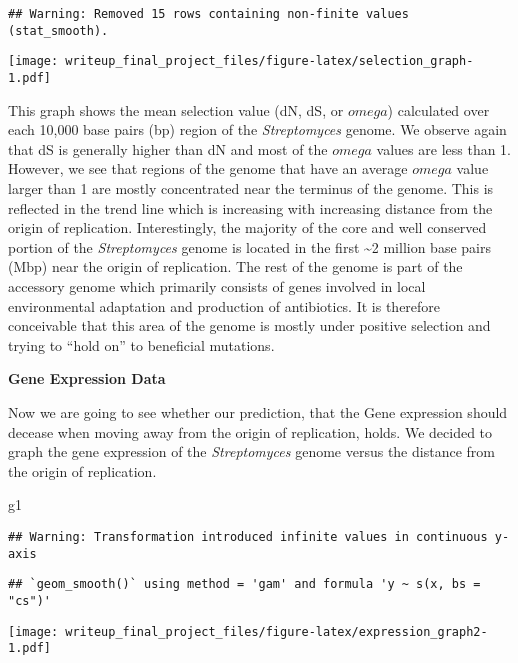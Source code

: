 \documentclass[12pt,]{article}
\newenvironment{Shaded}{\begin{snugshade}}{\end{snugshade}}
\newcommand{\NormalTok}[1]{#1}
\begin{document}
\begin{verbatim}
## Warning: Removed 15 rows containing non-finite values (stat_smooth).
\end{verbatim}

\texttt{[image: writeup\_final\_project\_files/figure-latex/selection\_graph-1.pdf]}

This graph shows the mean selection value (dN, dS, or \(omega\))
calculated over each 10,000 base pairs (bp) region of the
\textit{Streptomyces}\xspace genome. We observe again that dS is
generally higher than dN and most of the \(omega\) values are less than
1. However, we see that regions of the genome that have an average
\(omega\) value larger than 1 are mostly concentrated near the terminus
of the genome. This is reflected in the trend line which is increasing
with increasing distance from the origin of replication. Interestingly,
the majority of the core and well conserved portion of the
\textit{Streptomyces}\xspace genome is located in the first
\textasciitilde2 million base pairs (Mbp) near the origin of
replication. The rest of the genome is part of the accessory genome
which primarily consists of genes involved in local environmental
adaptation and production of antibiotics. It is therefore conceivable
that this area of the genome is mostly under positive selection and
trying to ``hold on'' to beneficial mutations.

\textbf{Gene Expression Data}

Now we are going to see whether our prediction, that the Gene expression
should decease when moving away from the origin of replication, holds.
We decided to graph the gene expression of the
\textit{Streptomyces}\xspace genome versus the distance from the origin
of replication.

\begin{Shaded}
\begin{Highlighting}[]
\NormalTok{g1}
\end{Highlighting}
\end{Shaded}

\begin{verbatim}
## Warning: Transformation introduced infinite values in continuous y-axis
\end{verbatim}

\begin{verbatim}
## `geom_smooth()` using method = 'gam' and formula 'y ~ s(x, bs = "cs")'
\end{verbatim}

\texttt{[image: writeup\_final\_project\_files/figure-latex/expression\_graph2-1.pdf]}
\end{document}

